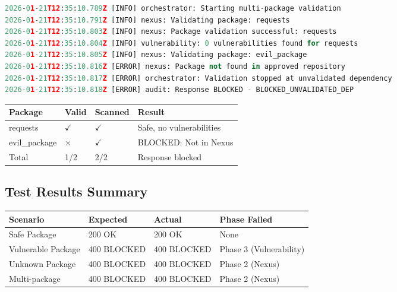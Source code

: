 \begin{lstlisting}[language=Python, caption={Multi-package validation logs}]
2026-01-21T12:35:10.789Z [INFO] orchestrator: Starting multi-package validation
2026-01-21T12:35:10.791Z [INFO] nexus: Validating package: requests
2026-01-21T12:35:10.803Z [INFO] nexus: Package validation successful: requests
2026-01-21T12:35:10.804Z [INFO] vulnerability: 0 vulnerabilities found for requests
2026-01-21T12:35:10.805Z [INFO] nexus: Validating package: evil_package
2026-01-21T12:35:10.816Z [ERROR] nexus: Package not found in approved repository
2026-01-21T12:35:10.817Z [ERROR] orchestrator: Validation stopped at unvalidated dependency
2026-01-21T12:35:10.818Z [ERROR] audit: Response BLOCKED - BLOCKED_UNVALIDATED_DEP
\end{lstlisting}

\begin{center}
\begin{tabular}{L{3cm} C{1.5cm} C{1.5cm} L{4cm}}
    \toprule
    \textbf{Package} & \textbf{Valid} & \textbf{Scanned} & \textbf{Result} \\
    \midrule
    requests & $\checkmark$ & $\checkmark$ & Safe, no vulnerabilities \\
    evil\_package & $\times$ & $\checkmark$ & BLOCKED: Not in Nexus \\
    Total & 1/2 & 2/2 & Response blocked \\
    \bottomrule
\end{tabular}
\end{center}

\subsection{Test Results Summary}
\label{sec:test-summary}

\begin{center}
\begin{tabular}{L{4cm} L{3cm} C{1.5cm} L{3cm}}
    \toprule
    \textbf{Scenario} & \textbf{Expected} & \textbf{Actual} & \textbf{Phase Failed} \\
    \midrule
    Safe Package & 200 OK & 200 OK & None \\
    Vulnerable Package & 400 BLOCKED & 400 BLOCKED & Phase 3 (Vulnerability) \\
    Unknown Package & 400 BLOCKED & 400 BLOCKED & Phase 2 (Nexus) \\
    Multi-package & 400 BLOCKED & 400 BLOCKED & Phase 2 (Nexus) \\
    \bottomrule
\end{tabular}
\end{center}


